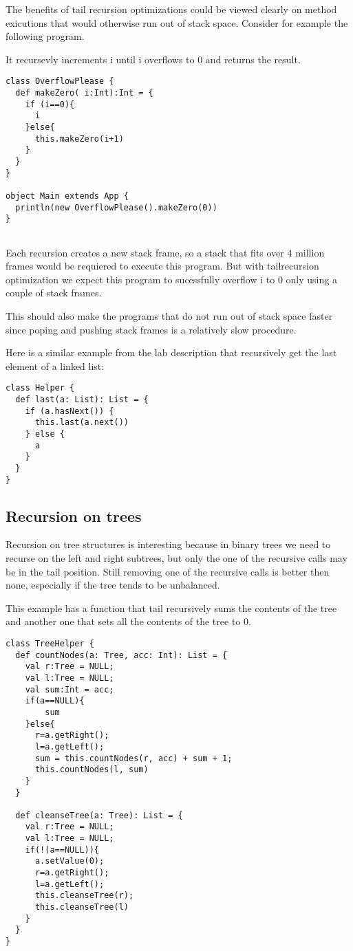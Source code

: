 The benefits of tail recursion optimizations could be viewed clearly on method exicutions that would otherwise run out of stack space. Consider for example the following program.

It recursevly increments i until i overflows to 0 and returns the result.
\begin{lstlisting}
class OverflowPlease {
  def makeZero( i:Int):Int = {
    if (i==0){
      i
    }else{
      this.makeZero(i+1)
    }
  }
}

object Main extends App {
  println(new OverflowPlease().makeZero(0))
}


\end{lstlisting}
Each recursion creates a new stack frame, so a stack that fits over 4 million frames would be requiered to execute this program. But with tailrecursion optimization we expect this program to sucessfully overflow i to 0 only using a couple of stack frames.

This should also make the programs that do not run out of stack space faster since poping and pushing stack frames is a relatively slow procedure.


Here is a similar example from the lab description that recursively get the last element of a linked list:

\begin{lstlisting}
class Helper {
  def last(a: List): List = {
    if (a.hasNext()) {
      this.last(a.next())
    } else {
      a
    }
  }
}
\end{lstlisting}

\subsection{Recursion on trees}

Recursion on tree structures is interesting because in binary trees we need to recurse on the left and right subtrees, but only the one of the recursive calls may be in the tail position. Still removing one of the recursive calls is better then none, especially if the tree tends to be unbalanced.

This example has a function that tail recursively sums the contents of the tree and another one that sets all the contents of the tree to 0.

\begin{lstlisting}
class TreeHelper {
  def countNodes(a: Tree, acc: Int): List = {
    val r:Tree = NULL;
    val l:Tree = NULL;
    val sum:Int = acc;
    if(a==NULL){
        sum
    }else{
      r=a.getRight();
      l=a.getLeft();
      sum = this.countNodes(r, acc) + sum + 1;
      this.countNodes(l, sum)
    }
  }
  
  def cleanseTree(a: Tree): List = {
    val r:Tree = NULL;
    val l:Tree = NULL;
    if(!(a==NULL)){
      a.setValue(0);
      r=a.getRight();
      l=a.getLeft();
      this.cleanseTree(r);
      this.cleanseTree(l)
    }
  }
}
\end{lstlisting}

